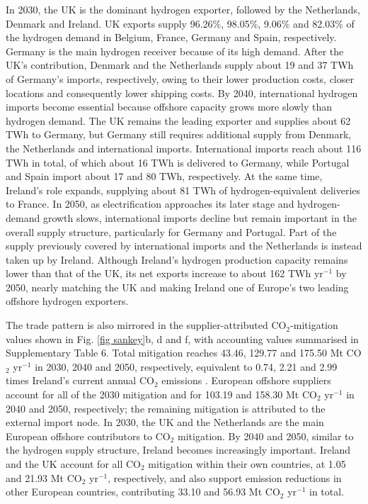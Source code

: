 \documentclass[pdflatex,sn-mathphys,Numbered]{sn-jnl}%
\begin{document}
In 2030, the UK is the dominant hydrogen exporter, followed by the Netherlands, Denmark and Ireland. UK exports supply 96.26\%, 98.05\%, 9.06\% and 82.03\% of the hydrogen demand in Belgium, France, Germany and Spain, respectively. Germany is the main hydrogen receiver because of its high demand. After the UK's contribution, Denmark and the Netherlands supply about 19 and 37 TWh of Germany's imports, respectively, owing to their lower production costs, closer locations and consequently lower shipping costs. By 2040, international hydrogen imports become essential because offshore capacity grows more slowly than hydrogen demand. The UK remains the leading exporter and supplies about 62 TWh to Germany, but Germany still requires additional supply from Denmark, the Netherlands and international imports. International imports reach about 116 TWh in total, of which about 16 TWh is delivered to Germany, while Portugal and Spain import about 17 and 80 TWh, respectively. At the same time, Ireland's role expands, supplying about 81 TWh of hydrogen-equivalent deliveries to France. In 2050, as electrification approaches its later stage and hydrogen-demand growth slows, international imports decline but remain important in the overall supply structure, particularly for Germany and Portugal. Part of the supply previously covered by international imports and the Netherlands is instead taken up by Ireland. Although Ireland's hydrogen production capacity remains lower than that of the UK, its net exports increase to about 162 TWh yr$^{-1}$ by 2050, nearly matching the UK and making Ireland one of Europe's two leading offshore hydrogen exporters.

The trade pattern is also mirrored in the supplier-attributed CO$_2$-mitigation values shown in Fig. \ref{fig sankey}b, d and f, with accounting values summarised in Supplementary Table 6. Total mitigation reaches 43.46, 129.77 and 175.50 Mt CO$_2$ yr$^{-1}$ in 2030, 2040 and 2050, respectively, equivalent to 0.74, 2.21 and 2.99 times Ireland's current annual CO$_2$ emissions \cite{COemissions}. European offshore suppliers account for all of the 2030 mitigation and for 103.19 and 158.30 Mt CO$_2$ yr$^{-1}$ in 2040 and 2050, respectively; the remaining mitigation is attributed to the external import node. In 2030, the UK and the Netherlands are the main European offshore contributors to CO$_2$ mitigation. By 2040 and 2050, similar to the hydrogen supply structure, Ireland becomes increasingly important. Ireland and the UK account for all CO$_2$ mitigation within their own countries, at 1.05 and 21.93 Mt CO$_2$ yr$^{-1}$, respectively, and also support emission reductions in other European countries, contributing 33.10 and 56.93 Mt CO$_2$ yr$^{-1}$ in total.
\end{document}
